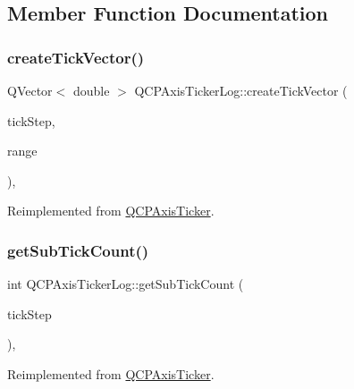 \subsection{Member Function Documentation}
\mbox{\label{class_q_c_p_axis_ticker_log_af8873a8d1d2b9392d8f7a73218c889ab}} 
\subsubsection{\texorpdfstring{createTickVector()}{createTickVector()}}
{\footnotesize\ttfamily Q\+Vector$<$ double $>$ Q\+C\+P\+Axis\+Ticker\+Log\+::create\+Tick\+Vector (\begin{DoxyParamCaption}\item[{double}]{tick\+Step,  }\item[{const \mbox{\hyperlink{class_q_c_p_range}{Q\+C\+P\+Range}} \&}]{range }\end{DoxyParamCaption})\hspace{0.3cm}{\ttfamily [protected]}, {\ttfamily [virtual]}}



Reimplemented from \mbox{\hyperlink{class_q_c_p_axis_ticker_af4645a824c7bd2ca8fc7e86ebf9055bd}{Q\+C\+P\+Axis\+Ticker}}.

\mbox{\label{class_q_c_p_axis_ticker_log_a352fef7ae68837acd26e35188aa86167}} 
\subsubsection{\texorpdfstring{getSubTickCount()}{getSubTickCount()}}
{\footnotesize\ttfamily int Q\+C\+P\+Axis\+Ticker\+Log\+::get\+Sub\+Tick\+Count (\begin{DoxyParamCaption}\item[{double}]{tick\+Step }\end{DoxyParamCaption})\hspace{0.3cm}{\ttfamily [protected]}, {\ttfamily [virtual]}}



Reimplemented from \mbox{\hyperlink{class_q_c_p_axis_ticker_a4ccc403ced7a1457ce6ba293509933c8}{Q\+C\+P\+Axis\+Ticker}}.


